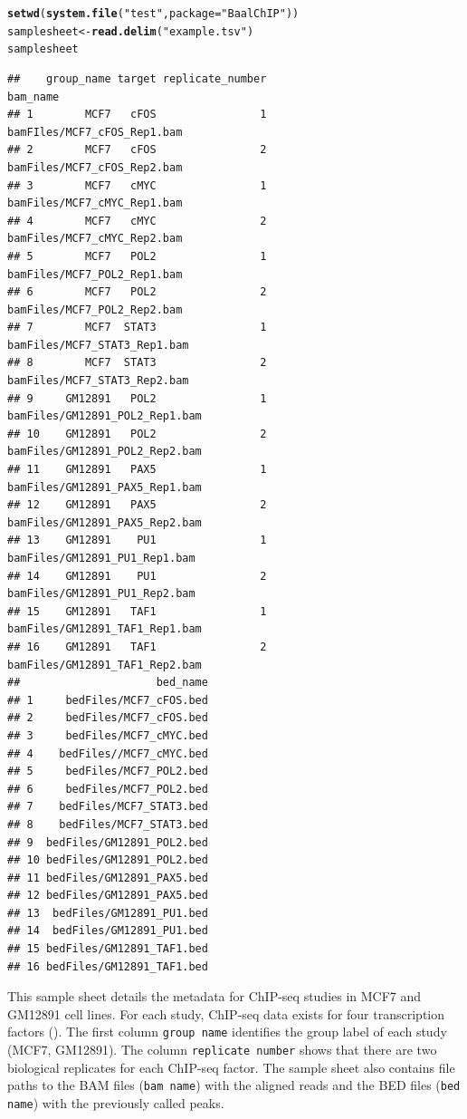 \documentclass{article}\usepackage[]{graphicx}\usepackage[usenames,dvipsnames]{color}
\makeatletter
\newcommand{\hlstr}[1]{\textcolor[rgb]{0.192,0.494,0.8}{#1}}%
\newcommand{\hlstd}[1]{\textcolor[rgb]{0.345,0.345,0.345}{#1}}%
\newcommand{\hlkwb}[1]{\textcolor[rgb]{0.69,0.353,0.396}{#1}}%
\newcommand{\hlkwc}[1]{\textcolor[rgb]{0.333,0.667,0.333}{#1}}%
\newcommand{\hlkwd}[1]{\textcolor[rgb]{0.737,0.353,0.396}{\textbf{#1}}}%
\newenvironment{kframe}{%
 \def\at@end@of@kframe{}%
 \ifinner\ifhmode%
  \def\at@end@of@kframe{\end{minipage}}%
  \begin{minipage}{\columnwidth}%
 \fi\fi%
 \def\FrameCommand##1{\hskip\@totalleftmargin \hskip-\fboxsep
 \colorbox{shadecolor}{##1}\hskip-\fboxsep
     \hskip-\linewidth \hskip-\@totalleftmargin \hskip\columnwidth}%
 \MakeFramed {\advance\hsize-\width
   \@totalleftmargin\z@ \linewidth\hsize
   \@setminipage}}%
 {\par\unskip\endMakeFramed%
 \at@end@of@kframe}
\newenvironment{knitrout}{}{} %
\makeatother
\begin{document}
\begin{knitrout}
\color{fgcolor}\begin{kframe}
\begin{alltt}
\hlkwd{setwd}\hlstd{(}\hlkwd{system.file}\hlstd{(}\hlstr{"test"}\hlstd{,}\hlkwc{package}\hlstd{=}\hlstr{"BaalChIP"}\hlstd{))}
\hlstd{samplesheet} \hlkwb{<-} \hlkwd{read.delim}\hlstd{(}\hlstr{"example.tsv"}\hlstd{)}
\hlstd{samplesheet}
\end{alltt}
\begin{verbatim}
##    group_name target replicate_number                       bam_name
## 1        MCF7   cFOS                1    bamFIles/MCF7_cFOS_Rep1.bam
## 2        MCF7   cFOS                2    bamFiles/MCF7_cFOS_Rep2.bam
## 3        MCF7   cMYC                1    bamFiles/MCF7_cMYC_Rep1.bam
## 4        MCF7   cMYC                2    bamFiles/MCF7_cMYC_Rep2.bam
## 5        MCF7   POL2                1    bamFiles/MCF7_POL2_Rep1.bam
## 6        MCF7   POL2                2    bamFiles/MCF7_POL2_Rep2.bam
## 7        MCF7  STAT3                1   bamFiles/MCF7_STAT3_Rep1.bam
## 8        MCF7  STAT3                2   bamFiles/MCF7_STAT3_Rep2.bam
## 9     GM12891   POL2                1 bamFiles/GM12891_POL2_Rep1.bam
## 10    GM12891   POL2                2 bamFiles/GM12891_POL2_Rep2.bam
## 11    GM12891   PAX5                1 bamFiles/GM12891_PAX5_Rep1.bam
## 12    GM12891   PAX5                2 bamFiles/GM12891_PAX5_Rep2.bam
## 13    GM12891    PU1                1  bamFiles/GM12891_PU1_Rep1.bam
## 14    GM12891    PU1                2  bamFiles/GM12891_PU1_Rep2.bam
## 15    GM12891   TAF1                1 bamFiles/GM12891_TAF1_Rep1.bam
## 16    GM12891   TAF1                2 bamFiles/GM12891_TAF1_Rep2.bam
##                     bed_name
## 1     bedFiles/MCF7_cFOS.bed
## 2     bedFiles/MCF7_cFOS.bed
## 3     bedFiles/MCF7_cMYC.bed
## 4    bedFiles//MCF7_cMYC.bed
## 5     bedFiles/MCF7_POL2.bed
## 6     bedFiles/MCF7_POL2.bed
## 7    bedFiles/MCF7_STAT3.bed
## 8    bedFiles/MCF7_STAT3.bed
## 9  bedFiles/GM12891_POL2.bed
## 10 bedFiles/GM12891_POL2.bed
## 11 bedFiles/GM12891_PAX5.bed
## 12 bedFiles/GM12891_PAX5.bed
## 13  bedFiles/GM12891_PU1.bed
## 14  bedFiles/GM12891_PU1.bed
## 15 bedFiles/GM12891_TAF1.bed
## 16 bedFiles/GM12891_TAF1.bed
\end{verbatim}
\end{kframe}
\end{knitrout}

This sample sheet details the metadata for ChIP-seq studies in MCF7 and GM12891 cell lines. For each study, ChIP-seq data exists for four transcription factors (). The first column \texttt{group name} identifies the group label of each study (MCF7, GM12891). The column \texttt{replicate number} shows that there are two biological replicates for each ChIP-seq factor. The sample sheet also contains file paths to the BAM files (\texttt{bam name}) with the aligned reads and the BED files (\texttt{bed name}) with the previously called peaks. 
\end{document}
